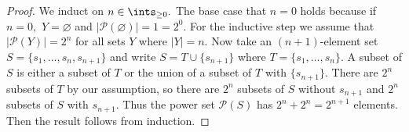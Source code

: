 \begin{proof}
    We induct on $n\in\ints_{\geq0}.$ The base case that $n=0$ holds because if $n=0,$ $Y=\varnothing$ and $|\mathcal{P}(\varnothing)|=1=2^0.$ For the inductive step we assume that $|\mathcal{P}(Y)|=2^n$ for all sets $Y$ where $|Y|=n.$ Now take an $(n+1)$-element set $S=\{s_1,\ldots,s_n,s_{n+1}\}$ and write $S=T \cup \{s_{n+1}\}$ where $T=\{s_1,\ldots,s_n\}.$ A subset of $S$ is either a subset of $T$ or the union of a subset of $T$ with $\{s_{n+1}\}.$ There are $2^n$ subsets of $T$ by our assumption, so there are $2^n$ subsets of $S$ without $s_{n+1}$ and $2^n$ subsets of $S$ with $s_{n+1}.$ Thus the power set $\mathcal{P}(S)$ has $2^n + 2^n = 2^{n+1}$ elements. Then the result follows from induction.
\end{proof}